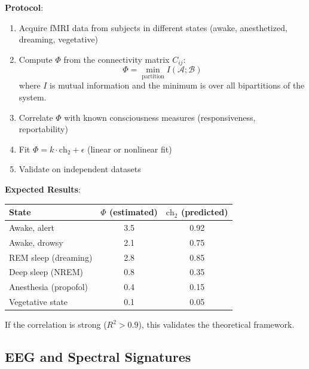 \textbf{Protocol}:
\begin{enumerate}
\item Acquire fMRI data from subjects in different states (awake, anesthetized, dreaming, vegetative)
\item Compute $\Phi$ from the connectivity matrix $C_{ij}$:
\begin{equation}
\Phi = \min_{\text{partition}} I(\mathcal{A}; \mathcal{B})
\end{equation}
where $I$ is mutual information and the minimum is over all bipartitions of the system.

\item Correlate $\Phi$ with known consciousness measures (responsiveness, reportability)
\item Fit $\Phi = k \cdot \text{ch}_2 + \epsilon$ (linear or nonlinear fit)
\item Validate on independent datasets
\end{enumerate}

\begin{level2}
\textbf{Expected Results}:

\begin{center}
\begin{tabular}{@{} l c c @{}}
\toprule
\textbf{State} & \textbf{$\Phi$ (estimated)} & \textbf{$\text{ch}_2$ (predicted)} \\
\midrule
Awake, alert & 3.5 & 0.92 \\
Awake, drowsy & 2.1 & 0.75 \\
REM sleep (dreaming) & 2.8 & 0.85 \\
Deep sleep (NREM) & 0.8 & 0.35 \\
Anesthesia (propofol) & 0.4 & 0.15 \\
Vegetative state & 0.1 & 0.05 \\
\bottomrule
\end{tabular}
\label{tab:phi-ch2-correlation}
\end{center}

If the correlation is strong ($R^2 > 0.9$), this validates the theoretical framework.
\end{level2}

\subsection{EEG and Spectral Signatures}

